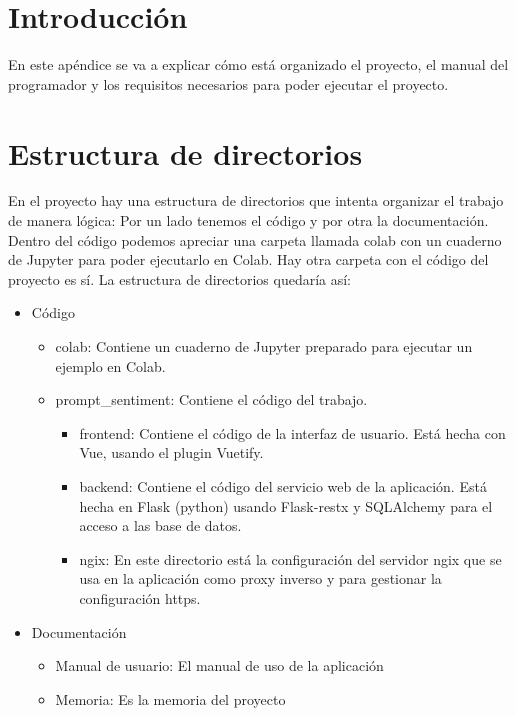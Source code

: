 
\section{Introducción}

En este apéndice se va a explicar cómo está organizado el proyecto, el
manual del programador y los requisitos necesarios para poder ejecutar el
proyecto.

\section{Estructura de directorios}

En el proyecto hay una estructura de directorios que intenta organizar el trabajo de manera lógica:
Por un lado tenemos el código y por otra la documentación.
Dentro del código podemos apreciar una carpeta llamada colab con un cuaderno de Jupyter para poder ejecutarlo en Colab.
Hay otra carpeta con el código del proyecto es sí.
La estructura de directorios quedaría así:

\begin{itemize}
	\item Código
	\begin{itemize}
		\item colab: Contiene un cuaderno de Jupyter preparado para ejecutar un ejemplo en Colab.
		\item prompt\_sentiment: Contiene el código del trabajo.
		\begin{itemize}
			\item frontend: Contiene el código de la interfaz de usuario. Está hecha con Vue, usando el plugin Vuetify.
			\item backend: Contiene el código del servicio web de la aplicación. Está hecha en Flask (python) usando Flask-restx y SQLAlchemy para el acceso a las base de datos.
			\item ngix: En este directorio está la configuración del servidor ngix que se usa en la aplicación como proxy inverso y para gestionar la configuración https.
		\end{itemize}
	\end{itemize}
	\item Documentación
	\begin{itemize}
		\item Manual de usuario: El manual de uso de la aplicación
		\item Memoria: Es la memoria del proyecto
	\end{itemize}
\end{itemize}

